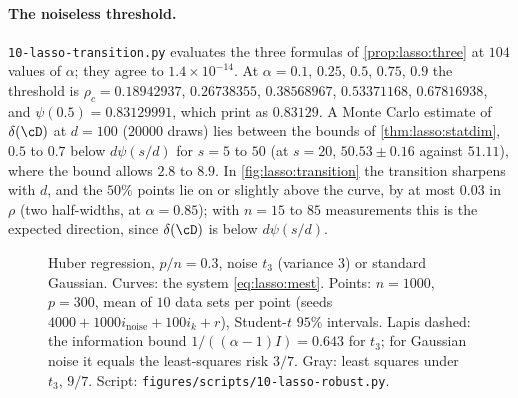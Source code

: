 \begin{refsection}
\paragraph{The noiseless threshold.} \texttt{10-lasso-transition.py} evaluates the three formulas of \cref{prop:lasso:three} at $104$ values of $\alpha$; they agree to $1.4\times10^{-14}$. At $\alpha=0.1$, $0.25$, $0.5$, $0.75$, $0.9$ the threshold is $\rho_c=0.18942937$, $0.26738355$, $0.38568967$, $0.53371168$, $0.67816938$, and $\psi(0.5)=0.83129991$, which \textcite{KabashimaEtAl2009} print as $0.83129$. A Monte Carlo estimate of $\delta(\cD)$ at $d=100$ ($20000$ draws) lies between the bounds of \cref{thm:lasso:statdim}, $0.5$ to $0.7$ below $d\psi(s/d)$ for $s=5$ to $50$ (at $s=20$, $50.53\pm0.16$ against $51.11$), where the bound allows $2.8$ to $8.9$. In \cref{fig:lasso:transition} the transition sharpens with $d$, and the $50\%$ points lie on or slightly above the curve, by at most $0.03$ in $\rho$ (two half-widths, at $\alpha=0.85$); with $n=15$ to $85$ measurements this is the expected direction, since $\delta(\cD)$ is below $d\psi(s/d)$.

\begin{figure}[t]
\centering
{}
\caption{Huber regression, $p/n=0.3$, noise $t_3$ (variance $3$) or standard Gaussian. Curves: the system \eqref{eq:lasso:mest}. Points: $n=1000$, $p=300$, mean of $10$ data sets per point (seeds $4000+1000i_{\mathrm{noise}}+100i_k+r$), Student-$t$ $95\%$ intervals. Lapis dashed: the information bound $1/((\alpha-1)I)=0.643$ for $t_3$; for Gaussian noise it equals the least-squares risk $3/7$. Gray: least squares under $t_3$, $9/7$. Script: \texttt{figures/scripts/10-lasso-robust.py}.}\label{fig:lasso:robust}
\end{figure}


\end{refsection}

